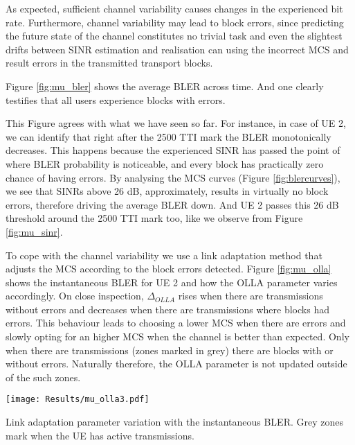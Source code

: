 
As expected, sufficient channel variability causes changes in the experienced bit rate. Furthermore, channel variability may lead to block errors, since predicting the future state of the channel constitutes no trivial task and even the slightest drifts between SINR estimation and realisation can using the incorrect MCS and result errors in the transmitted transport blocks.

Figure \ref{fig:mu_bler} shows the average BLER across time. And one clearly testifies that all users experience blocks with errors.

This Figure agrees with what we have seen so far. For instance, in case of \ac{UE} 2, we can identify that right after the 2500 TTI mark the BLER monotonically decreases. This happens because the experienced SINR has passed the point of where BLER probability is noticeable, and every block has practically zero chance of having errors. By analysing the \acs{MCS} curves (Figure \ref{fig:blercurves}), we see that \acsp{SINR} above 26 dB, approximately, results in virtually no block errors, therefore driving the average BLER down. And UE 2 passes this 26 dB threshold around the 2500 TTI mark too, like we observe from Figure \ref{fig:mu_sinr}.



To cope with the channel variability we use a link adaptation method that adjusts the MCS according to the block errors detected. Figure \ref{fig:mu_olla} shows the instantaneous \acs{BLER} for UE 2 and how the OLLA parameter varies accordingly. On close inspection, $\Delta_{OLLA}$ rises when there are transmissions without errors and decreases when there are transmissions where blocks had errors. This behaviour leads to choosing a lower MCS when there are errors and slowly opting for an higher MCS when the channel is better than expected. Only when there are transmissions (zones marked in grey) there are blocks with or without errors. Naturally therefore, the \acs{OLLA} parameter is not updated outside of the such zones.

\begin{center}

    \hfill \texttt{[image: Results/mu\_olla3.pdf]}
    \captionsetup{type=figure} 
    \vspace{-3mm}   
    \caption{Link adaptation parameter variation with the instantaneous \acs{BLER}. Grey zones mark when the UE has active transmissions.}			
    \label{fig:mu_olla}
    
\end{center}

